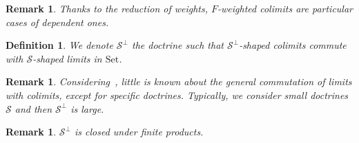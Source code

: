 \documentclass{article}
\newcommand{\Set}{\text{Set}}
\newtheorem{definition}[theorem]{Definition}
\newtheorem{remark}[theorem]{Remark}
\begin{document}
\begin{remark}
 Thanks to the reduction of weights, $F$-weighted colimits are particular cases
 of dependent ones.
\end{remark}
\begin{definition}
  We denote $\mathcal{S}^\bot$ the doctrine such that
  $\mathcal{S}^\bot$-shaped colimits commute with 
  $\mathcal{S}$-shaped limits in $\Set$.
\end{definition}
\begin{remark}
  Considering~\cite{lack_accessible, commutationlim}, little is known about the
  general commutation of limits with colimits, except for specific doctrines.
  Typically, we consider small doctrines $\mathcal{S}$ and then
  $\mathcal{S}^\bot$ is large.
\end{remark}
\begin{remark}
$\mathcal{S}^\bot$ is closed under finite products.
\end{remark}
\end{document}

